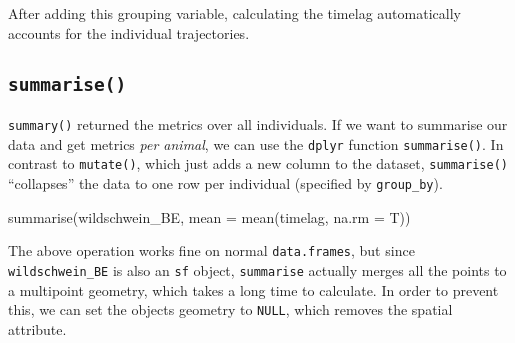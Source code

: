 \documentclass[
]{book}
\newenvironment{Shaded}{\begin{snugshade}}{\end{snugshade}}
\newcommand{\AttributeTok}[1]{\textcolor[rgb]{0.77,0.63,0.00}{#1}}
\newcommand{\DocumentationTok}[1]{\textcolor[rgb]{0.56,0.35,0.01}{\textbf{\textit{#1}}}}
\newcommand{\FunctionTok}[1]{\textcolor[rgb]{0.00,0.00,0.00}{#1}}
\newcommand{\NormalTok}[1]{#1}
\newcommand{\OtherTok}[1]{\textcolor[rgb]{0.56,0.35,0.01}{#1}}
\newcommand{\SpecialCharTok}[1]{\textcolor[rgb]{0.00,0.00,0.00}{#1}}
\newcommand{\StringTok}[1]{\textcolor[rgb]{0.31,0.60,0.02}{#1}}
\begin{document}
After adding this grouping variable, calculating the timelag automatically accounts for the individual trajectories.

\begin{Shaded}
\end{Shaded}

\hypertarget{summarise}{%
\subsection{\texorpdfstring{\texttt{summarise()}}{summarise()}}\label{summarise}}

\texttt{summary()} returned the metrics over all individuals. If we want to summarise our data and get metrics \emph{per animal}, we can use the \texttt{dplyr} function \texttt{summarise()}. In contrast to \texttt{mutate()}, which just adds a new column to the dataset, \texttt{summarise()} ``collapses'' the data to one row per individual (specified by \texttt{group\_by}).

\begin{Shaded}
\begin{Highlighting}[]
\FunctionTok{summarise}\NormalTok{(wildschwein\_BE, }\AttributeTok{mean =} \FunctionTok{mean}\NormalTok{(timelag, }\AttributeTok{na.rm =}\NormalTok{ T))}
\end{Highlighting}
\end{Shaded}

The above operation works fine on normal \texttt{data.frames}, but since \texttt{wildschwein\_BE} is also an \texttt{sf} object, \texttt{summarise} actually merges all the points to a multipoint geometry, which takes a long time to calculate. In order to prevent this, we can set the objects geometry to \texttt{NULL}, which removes the spatial attribute.
\end{document}
